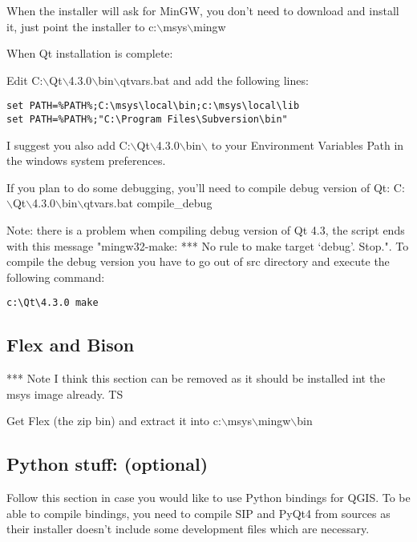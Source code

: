 When the installer will ask for MinGW, you don't need to download and install
it, just point the installer to c:$\backslash$msys$\backslash$mingw

When Qt installation is complete:

Edit C:$\backslash$Qt$\backslash$4.3.0$\backslash$bin$\backslash$qtvars.bat and add the following lines:

\begin{verbatim}
set PATH=%PATH%;C:\msys\local\bin;c:\msys\local\lib 
set PATH=%PATH%;"C:\Program Files\Subversion\bin" 
\end{verbatim}

I suggest you also add C:$\backslash$Qt$\backslash$4.3.0$\backslash$bin$\backslash$ to your Environment Variables Path in
the windows system preferences.

If you plan to do some debugging, you'll need to compile debug version of Qt:
C:$\backslash$Qt$\backslash$4.3.0$\backslash$bin$\backslash$qtvars.bat compile\_debug

Note: there is a problem when compiling debug version of Qt 4.3, the script ends with
this message  "mingw32-make: *** No rule to make target `debug'.  Stop.". To 
compile the debug version you have to go out of src directory and execute the
following command:

\begin{verbatim}
c:\Qt\4.3.0 make 
\end{verbatim}

\subsection{Flex and Bison}
*** Note I think this section can be removed as it should be installed int the
msys image already. TS

Get Flex
(the zip bin) and extract it into c:$\backslash$msys$\backslash$mingw$\backslash$bin

\subsection{Python stuff: (optional)}
Follow this section in case you would like to use Python bindings for QGIS.  To
be able to compile bindings, you need to compile SIP and PyQt4 from sources as
their installer doesn't include some development files which are necessary.

